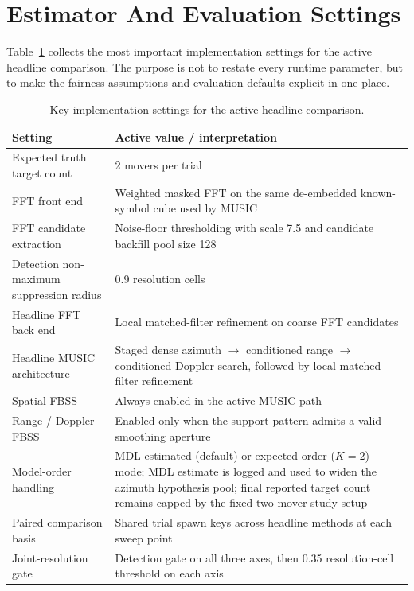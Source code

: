 \documentclass[11pt]{article}
\begin{document}
\appendix

\section{Estimator And Evaluation Settings}
\label{app:settings}

Table~\ref{tab:estimator-settings} collects the most important implementation settings for the active headline comparison. The purpose is not to restate every runtime parameter, but to make the fairness assumptions and evaluation defaults explicit in one place.

\begin{table}[H]
\centering
\small
\caption{Key implementation settings for the active headline comparison.}
\label{tab:estimator-settings}
\begin{tabular}{>{\raggedright\arraybackslash}p{2.3in}p{3.1in}}
\toprule
Setting & Active value / interpretation \\
\midrule
Expected truth target count & 2 movers per trial \\
FFT front end & Weighted masked FFT on the same de-embedded known-symbol cube used by MUSIC \\
FFT candidate extraction & Noise-floor thresholding with scale 7.5 and candidate backfill pool size 128 \\
Detection non-maximum suppression radius & 0.9 resolution cells \\
Headline FFT back end & Local matched-filter refinement on coarse FFT candidates \\
Headline MUSIC architecture & Staged dense azimuth $\rightarrow$ conditioned range $\rightarrow$ conditioned Doppler search, followed by local matched-filter refinement \\
Spatial FBSS & Always enabled in the active MUSIC path \\
Range / Doppler FBSS & Enabled only when the support pattern admits a valid smoothing aperture \\
Model-order handling & MDL-estimated (default) or expected-order ($K=2$) mode; MDL estimate is logged and used to widen the azimuth hypothesis pool; final reported target count remains capped by the fixed two-mover study setup \\
Paired comparison basis & Shared trial spawn keys across headline methods at each sweep point \\
Joint-resolution gate & Detection gate on all three axes, then 0.35 resolution-cell threshold on each axis \\
\bottomrule
\end{tabular}
\end{table}
\end{document}
